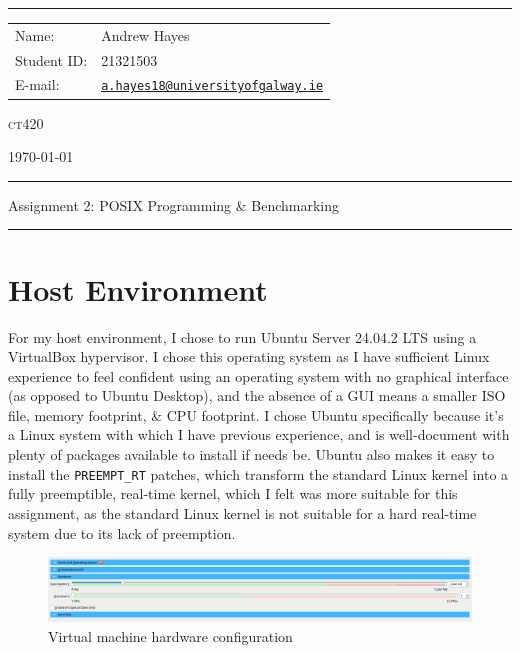 \documentclass[a4paper]{article}
\begin{document}
\hrule \medskip
\begin{minipage}{0.295\textwidth} 
    \raggedright
    \footnotesize 
    \begin{tabular}{@{}l l}
        Name: & Andrew Hayes \\
        Student ID: & 21321503 \\
        E-mail: & \href{mailto://a.hayes18@universityofgalway.ie}{\texttt{a.hayes18@universityofgalway.ie}} \\
    \end{tabular}
\end{minipage}
\begin{minipage}{0.4\textwidth} 
    \centering 
    \vspace{0.4em}
    \LARGE
    \textsc{ct420} \\ 
\end{minipage}
\begin{minipage}{0.295\textwidth} 
    \raggedleft
    \today
\end{minipage}
\medskip\hrule 
\begin{center}
    \normalsize
    Assignment 2: POSIX Programming \& Benchmarking
\end{center}
\hrule
\medskip

\section{Host Environment}
For my host environment, I chose to run Ubuntu Server 24.04.2 LTS using a VirtualBox hypervisor.
I chose this operating system as I have sufficient Linux experience to feel confident using an operating system with no graphical interface (as opposed to Ubuntu Desktop), and the absence of a GUI means a smaller ISO file, memory footprint, \& CPU footprint.
I chose Ubuntu specifically because it's a Linux system with which I have previous experience, and is well-document with plenty of packages available to install if needs be.
Ubuntu also makes it easy to install the \verb|PREEMPT_RT| patches, which transform the standard Linux kernel into a fully preemptible, real-time kernel, which I felt was more suitable for this assignment, as the standard Linux kernel is not suitable for a hard real-time system due to its lack of preemption.

\begin{figure}[H]
    \centering
    \includegraphics[width=\textwidth]{./images/hardware.png}
    \caption{Virtual machine hardware configuration}
\end{figure}
\end{document}
